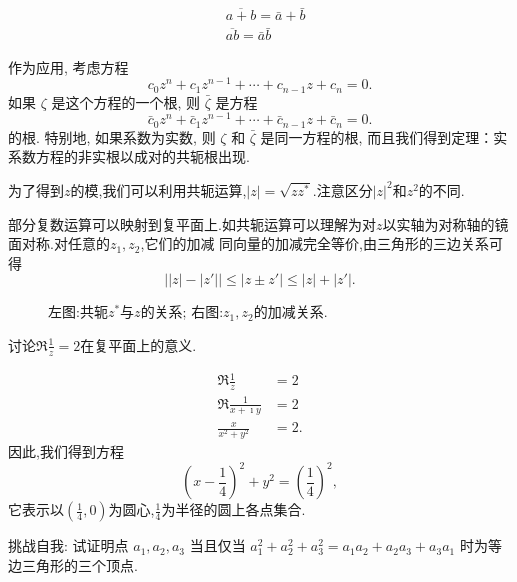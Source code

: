 \begin{equation}
    \begin{aligned}
    & \overline{a+b}=\bar{a}+\bar{b} \\
    & \overline{a b}=\bar{a} \bar{b}
    \end{aligned}
\end{equation}

作为应用, 考虑方程
$$
c_0 z^n+c_1 z^{n-1}+\cdots+c_{n-1} z+c_n=0 .
$$
如果 $\zeta$ 是这个方程的一个根, 则 $\bar{\zeta}$ 是方程
$$
\bar{c}_0 z^n+\bar{c}_1 z^{n-1}+\cdots+\bar{c}_{n-1} z+\bar{c}_n=0 .
$$
的根. 特别地, 如果系数为实数, 则 $\zeta$ 和 $\bar{\zeta}$ 是同一方程的根, 
而且我们得到定理：实系数方程的非实根以成对的共轭根出现.

为了得到$z$的模,我们可以利用共轭运算,$|z| = \sqrt{zz^{*}}$.注意区分$|z|^2$和$z^2$的不同.

部分复数运算可以映射到复平面上.如共轭运算可以理解为对$z$以实轴为对称轴的镜面对称.对任意的$z_1,z_2$,它们的加减
同向量的加减完全等价,由三角形的三边关系可得
\begin{equation}
    \left| |z|- |z'| \right| \leq |z \pm z'| \leq |z| + |z'| .
\end{equation}
\begin{figure}[htb]
    \centering
    
\quad 
        
        \caption{左图:共轭$z^{*}$与$z$的关系; 右图:$z_1, z_2$的加减关系.}
\end{figure}
 

\begin{example}
讨论$\Re \frac{1}{z} = 2$在复平面上的意义.
\end{example}
\begin{solution}
    \begin{align*}
        \Re \frac{1}{z} &= 2\\
        \Re \frac{1}{x+\imath y} &  = 2 \\
        \frac{x}{x^2 +y^2} & = 2 .
    \end{align*}
因此,我们得到方程
\[
    (x-\frac{1}{4})^2 + y^2 = \left( \frac{1}{4}\right)^2,
\]
它表示以$(\frac{1}{4},0)$为圆心,$\frac{1}{4}$为半径的圆上各点集合.
\end{solution}
        

\begin{note}
    挑战自我: 试证明点 $a_1, a_2, a_3$ 当且仅当 
    $a_1^2+a_2^2+a_3^2=a_1 a_2+a_2 a_3+a_3 a_1$ 时为等边三角形的三个顶点.    
\end{note}


